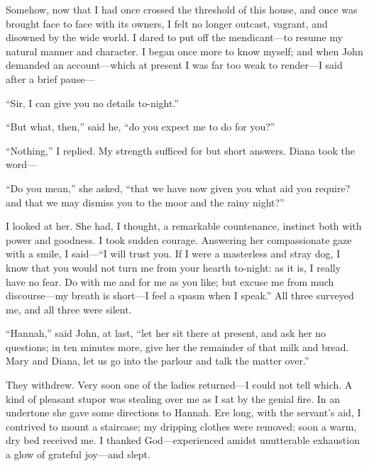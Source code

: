 Somehow, now that I had once crossed the threshold of this house, and
once was brought face to face with its owners, I felt no longer outcast,
vagrant, and disowned by the wide world. I dared to put off the
mendicant---to resume my natural manner and character. I began once
more to know myself; and when \Mr{} \St{} John demanded an account---which
at present I was far too weak to render---I said after a brief pause---

\enquote{Sir, I can give you no details to-night.}

\enquote{But what, then,} said he, \enquote{do you expect me to do for
	you?}

\enquote{Nothing,} I replied. My strength sufficed for but short
answers. Diana took the word---

\enquote{Do you mean,} she asked, \enquote{that we have now given you
	what aid you require? and that we may dismiss you to the moor and the
	rainy night?}

I looked at her. She had, I thought, a remarkable countenance, instinct
both with power and goodness. I took sudden courage. Answering her
compassionate gaze with a smile, I said---\enquote{I will trust you. If
	I were a masterless and stray dog, I know that you would not turn me
	from your hearth to-night: as it is, I really have no fear. Do with me
	and for me as you like; but excuse me from much discourse---my breath is
	short---I feel a spasm when I speak.} All three surveyed me, and all
three were silent.

\enquote{Hannah,} said \Mr{} \St{} John, at last, \enquote{let her sit there
	at present, and ask her no questions; in ten minutes more, give her the
	remainder of that milk and bread. Mary and Diana, let us go into the
	parlour and talk the matter over.}

They withdrew. Very soon one of the ladies returned---I could not tell
which. A kind of pleasant stupor was stealing over me as I sat by the
genial fire. In an undertone she gave some directions to Hannah. Ere
long, with the servant's aid, I contrived to mount a staircase; my
dripping clothes were removed; soon a warm, dry bed received me. I
thanked God---experienced amidst unutterable exhaustion a glow of
grateful joy---and slept.
